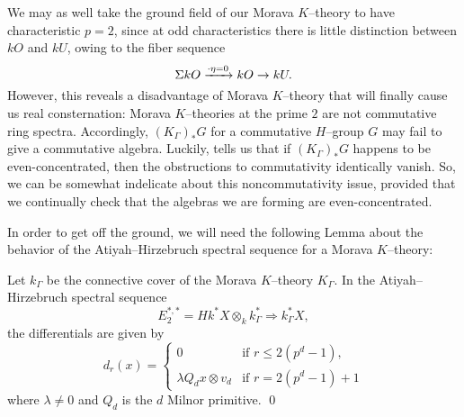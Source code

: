 \begin{remark}
We may as well take the ground field of our Morava $K$--theory to have characteristic $p = 2$, since at odd characteristics there is little distinction between $kO$ and $kU$, owing to the fiber sequence \[\Sigma kO \xrightarrow{\cdot \eta = 0} kO \to kU.\]  However, this reveals a disadvantage of Morava $K$--theory that will finally cause us real consternation: Morava $K$--theories at the prime $2$ are not commutative ring spectra.  Accordingly, $(K_\Gamma)_* G$ for a commutative $H$--group $G$ may fail to give a commutative algebra.  Luckily,  tells us that if $(K_\Gamma)_* G$ happens to be even-concentrated, then the obstructions to commutativity identically vanish.  So, we can be somewhat indelicate about this noncommutativity issue, provided that we continually check that the algebras we are forming are even-concentrated.
\end{remark}

In order to get off the ground, we will need the following Lemma about the behavior of the Atiyah--Hirzebruch spectral sequence for a Morava $K$--theory:
\begin{lemma}\label{MoravaKThyAHSS}
Let $k_\Gamma$ be the connective cover of the Morava $K$--theory $K_\Gamma$.  In the Atiyah--Hirzebruch spectral sequence \[E_2^{*, *} = Hk^* X \otimes_k k_\Gamma^* \Rightarrow k_\Gamma^* X,\] the differentials are given by \[d_r(x) = \begin{cases} 0 & \text{if $r \le 2(p^d - 1)$}, \\ \lambda Q_d x \otimes v_d & \text{if $r = 2(p^d - 1) + 1$} \end{cases}\] where $\lambda \ne 0$ and $Q_d$ is the $d${\th} Milnor primitive. \qed
\end{lemma}

